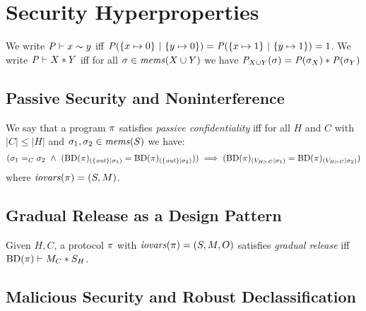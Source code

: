 \section{Security Hyperproperties}

\begin{definition}
  We write $\mathit{P} \vdash x \sim y$ iff $\mathit{P}(\{ x \mapsto 0\}\ |\ \{ y \mapsto 0 \}) =
  \mathit{P}(\{ x \mapsto 1\}\ |\ \{ y \mapsto 1 \}) = 1$.
  We write $\mathit{P} \vdash X * Y$ iff for all
    $\sigma \in \mathit{mems}(X \cup Y)$ we have
  ${\mathit{P}}_{X \cup Y}(\sigma) =
  \mathit{P}(\sigma_X) * \mathit{P}(\sigma_Y)$
\end{definition}


\subsection{Passive Security and Noninterference}


\begin{definition}
  \label{definition-NIMO}
  We say that a program $\pi$ satisfies \emph{passive confidentiality}
  iff for all $H$ and $C$ with $|C|\le|H|$ and 
  $\sigma_1,\sigma_2 \in \mathit{mems}(S)$ we have:
  $$
  (\store_1 =_C \store_2 \ \wedge \ 
  (\condd{\progtt(\prog)}{\{ \outv \}}{\store_1} = \condd{\progtt(\prog)}{\{ \outv \}}{\store_2}))
  \implies 
  (\condd{\progtt(\prog)}{\houtputs}{\store_1} = \condd{\progtt(\prog)}{\houtputs}{\store_2})
  $$
  where $\mathit{iovars}(\pi) = (S,M)$.
\end{definition}

\subsection{Gradual Release as a Design Pattern}

\begin{definition}
  Given $H,C$, a protocol $\pi$ with $\mathit{iovars}(\pi) = (S,M,O)$ satisfies \emph{gradual release} iff
  $\mathrm{BD}(\pi) \vdash M_C * S_H$.
\end{definition}

\subsection{Malicious Security and Robust Declassification}

